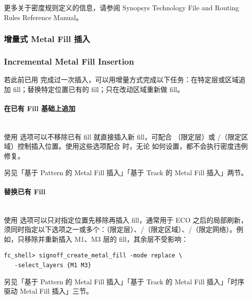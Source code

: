 更多关于密度规则定义的信息，请参阅 Synopsys Technology File and Routing Rules Reference Manual。

\subsubsection{增量式 Metal Fill 插入}
\subsubsection*{Incremental Metal Fill Insertion}

若此前已用  完成过一次插入，可以用增量方式完成以下任务：在特定层或区域追加 fill；替换特定位置已有的 fill；只在改动区域重新做 fill。

\paragraph{在已有 Fill 基础上追加}
\hfill\\
使用  选项可以不移除已有 fill 就直接插入新 fill，可配合 （限定层）或 /（限定区域）控制插入位置。使用这些选项配合  时，无论  如何设置，都不会执行密度违例修复。

\begin{seeAlsoBox}
另见「基于 Pattern 的 Metal Fill 插入」「基于 Track 的 Metal Fill 插入」两节。
\end{seeAlsoBox}

\paragraph{替换已有 Fill}
\hfill\\
使用  选项可以只对指定位置先移除再插入 fill，通常用于 ECO 之后的局部刷新，须同时指定以下选项之一或多个：（限定层）、/（限定区域）、/（限定网络）。例如，只移除并重新插入 M1、M3 层的 fill，其余层不受影响：

\begin{lstlisting}
fc_shell> signoff_create_metal_fill -mode replace \
   -select_layers {M1 M3}
\end{lstlisting}

\begin{seeAlsoBox}
另见「基于 Pattern 的 Metal Fill 插入」「基于 Track 的 Metal Fill 插入」「时序驱动 Metal Fill 插入」三节。
\end{seeAlsoBox}

